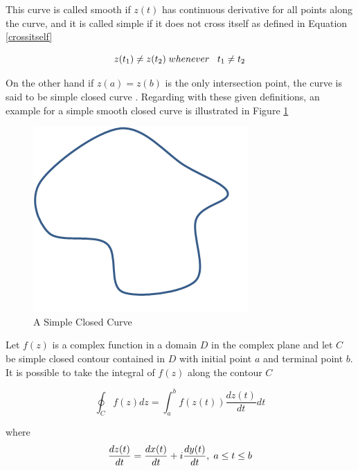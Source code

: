 This curve is called smooth if $z(t)$ has continuous derivative for all points along the curve, and it is called simple if it does not cross itself as defined in Equation \ref{crossitself}

\begin{equation} \label{crossitself}
z(t_1) \neq z(t_2)   \hspace{0.1cm} whenever   \hspace{0.3cm} t_1\neq t_2
\end{equation}
		
On the other hand if  $z(a)=z(b)$ is the only intersection point, the curve is said to be simple closed curve \cite{wiki_contour}. Regarding with these given definitions, an example for a  simple smooth closed curve is illustrated in Figure \ref{simple_closed_curve_ref}

\begin{figure}[H]
\caption{A Simple Closed Curve} \label{simple_closed_curve_ref}
\centering
\includegraphics[scale = 0.60]{simple_closed_curve}
\end{figure}
		
Let $f(z)$ is a complex function in a domain $D$ in the complex plane and let $C$ be simple closed contour contained in $D$ with initial point $a$ and terminal point  $b$. It is possible to take the integral of $f(z)$ along the contour $C$ \cite{wiki_contour}
		
\begin{equation}
\oint_C f(z) dz = \int_{a}^{b} f(z(t))\frac{dz(t)}{dt} dt
\end{equation}
		
where
\begin{equation}
\frac{dz(t)}{dt} = \frac{dx(t)}{dt} + i\frac{dy(t)}{dt},   \hspace{0.1cm} a\leq t\leq b
\end{equation}
		
